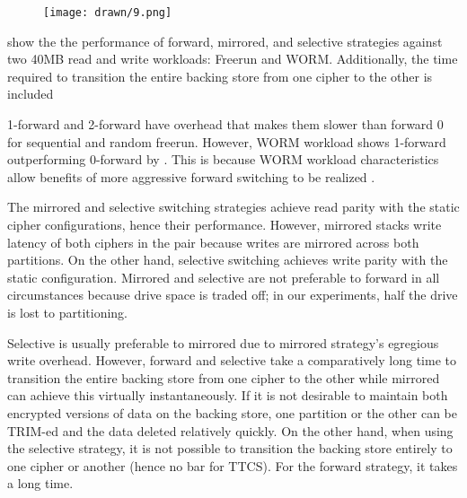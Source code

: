  

\begin{figure}[ht]
 \centering
  \texttt{[image: drawn/9.png]}
   \caption{}\label{fig:strategy-vs-strategy}
\end{figure}

 show the the performance of forward, mirrored, and
selective strategies against two 40MB read and write workloads: Freerun and
WORM.  Additionally, the time required to
transition the entire backing store from one cipher to the other is included

1-forward and 2-forward have overhead that makes them slower than forward 0 for
sequential and random freerun. However, WORM workload shows 1-forward
outperforming 0-forward by . This is
because WORM workload characteristics allow benefits of more aggressive forward
switching to be realized .

The mirrored and selective switching strategies achieve read parity with the
static cipher configurations, hence their performance. However, mirrored stacks
write latency of both ciphers in the pair because writes are mirrored across
both partitions. On the other hand, selective switching achieves write parity
with the static configuration. Mirrored and selective are not preferable to
forward in all circumstances because drive space is traded off; in our
experiments, half the drive is lost to partitioning.


Selective is usually preferable to mirrored due to mirrored strategy's egregious
write overhead. However, forward and selective take a comparatively long time to
transition the entire backing store from one cipher to the other while mirrored
can achieve this virtually instantaneously. If it is not desirable to maintain
both encrypted versions of data on the backing store, one partition or the other
can be TRIM-ed and the data deleted relatively quickly. On the other hand, when
using the selective strategy, it is not possible to transition the backing store
entirely to one cipher or another (hence no bar for TTCS). For the forward
strategy, it takes a long time. 

